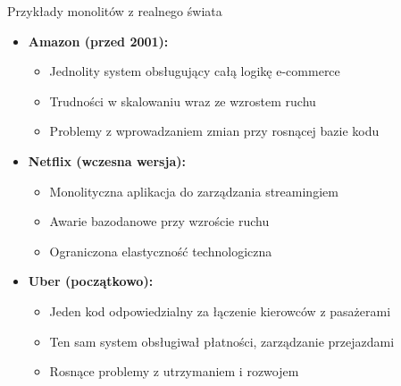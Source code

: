 \documentclass[aspectratio=169,xcolor=table]{beamer}
\begin{document}
\begin{frame}{Przykłady monolitów z realnego świata}
  \begin{itemize}
    \item \textbf{Amazon (przed 2001):}
      \begin{itemize}
        \item Jednolity system obsługujący całą logikę e-commerce
        \item Trudności w skalowaniu wraz ze wzrostem ruchu
        \item Problemy z wprowadzaniem zmian przy rosnącej bazie kodu
      \end{itemize}
    \item \textbf{Netflix (wczesna wersja):}
      \begin{itemize}
        \item Monolityczna aplikacja do zarządzania streamingiem
        \item Awarie bazodanowe przy wzroście ruchu
        \item Ograniczona elastyczność technologiczna
      \end{itemize}
    \item \textbf{Uber (początkowo):}
      \begin{itemize}
        \item Jeden kod odpowiedzialny za łączenie kierowców z pasażerami
        \item Ten sam system obsługiwał płatności, zarządzanie przejazdami
        \item Rosnące problemy z utrzymaniem i rozwojem
      \end{itemize}
  \end{itemize}
\end{frame}
\end{document}

